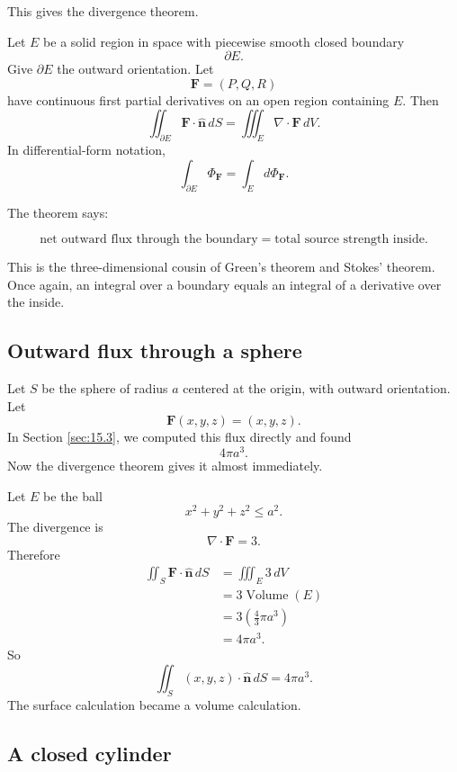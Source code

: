 This gives the divergence theorem.

\begin{theorem}
Let \(E\) be a solid region in space with piecewise smooth closed boundary
\[
    \partial E.
\]
Give \(\partial E\) the outward orientation.  Let
\[
    \mathbf F=(P,Q,R)
\]
have continuous first partial derivatives on an open region containing \(E\).  Then
\[
\boxed{
    \iint_{\partial E}
    \mathbf F\cdot\widehat{\mathbf n}\,dS
    =
    \iiint_E
    \nabla\cdot\mathbf F\,dV.
}
\]
In differential-form notation,
\[
\boxed{
    \int_{\partial E}\Phi_{\mathbf F}
    =
    \int_E d\Phi_{\mathbf F}.
}
\]
\end{theorem}

The theorem says:

\[
\boxed{
    \text{net outward flux through the boundary}
    =
    \text{total source strength inside}.
}
\]

This is the three-dimensional cousin of Green's theorem and Stokes' theorem.  Once
again, an integral over a boundary equals an integral of a derivative over the inside.

\subsection{Outward flux through a sphere}

Let \(S\) be the sphere of radius \(a\) centered at the origin, with outward orientation.
Let
\[
    \mathbf F(x,y,z)=(x,y,z).
\]
In Section \ref{sec:15.3}, we computed this flux directly and found
\[
    4\pi a^3.
\]
Now the divergence theorem gives it almost immediately.

Let \(E\) be the ball
\[
    x^2+y^2+z^2\le a^2.
\]
The divergence is
\[
    \nabla\cdot\mathbf F=3.
\]
Therefore
\[
\begin{aligned}
\iint_S \mathbf F\cdot\widehat{\mathbf n}\,dS
&=
\iiint_E 3\,dV\\
&=
3\operatorname{Volume}(E)\\
&=
3\left(\frac43\pi a^3\right)\\
&=
4\pi a^3.
\end{aligned}
\]
So
\[
\boxed{
    \iint_S (x,y,z)\cdot\widehat{\mathbf n}\,dS=4\pi a^3.
}
\]
The surface calculation became a volume calculation.

\subsection{A closed cylinder}

